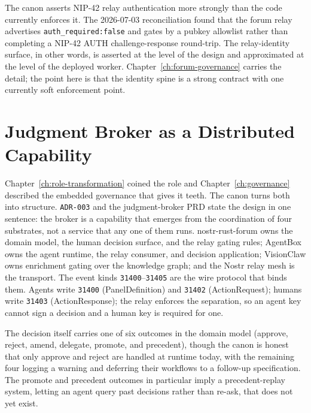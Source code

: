 The canon asserts NIP-42 relay authentication more strongly than the code currently enforces it. The 2026-07-03 reconciliation found that the forum relay advertises \texttt{auth\_required:false} and gates by a pubkey allowlist rather than completing a NIP-42 AUTH challenge-response round-trip. The relay-identity surface, in other words, is asserted at the level of the design and approximated at the level of the deployed worker. Chapter~\ref{ch:forum-governance} carries the detail; the point here is that the identity spine is a strong contract with one currently soft enforcement point.

\section{Judgment Broker as a Distributed Capability}

Chapter~\ref{ch:role-transformation} coined the  role and Chapter~\ref{ch:governance} described the embedded governance that gives it teeth. The canon turns both into structure. \texttt{ADR-003} and the judgment-broker PRD state the design in one sentence: the broker is a capability that emerges from the coordination of four substrates, not a service that any one of them runs. nostr-rust-forum owns the domain model, the human decision surface, and the relay gating rules; AgentBox owns the agent runtime, the relay consumer, and decision application; VisionClaw owns enrichment gating over the knowledge graph; and the Nostr relay mesh is the transport. The event kinds \texttt{31400}--\texttt{31405} are the wire protocol that binds them. Agents write \texttt{31400} (PanelDefinition) and \texttt{31402} (ActionRequest); humans write \texttt{31403} (ActionResponse); the relay enforces the separation, so an agent key cannot sign a decision and a human key is required for one.

The decision itself carries one of six outcomes in the domain model (approve, reject, amend, delegate, promote, and precedent), though the canon is honest that only approve and reject are handled at runtime today, with the remaining four logging a warning and deferring their workflows to a follow-up specification. The promote and precedent outcomes in particular imply a precedent-replay system, letting an agent query past decisions rather than re-ask, that does not yet exist.

